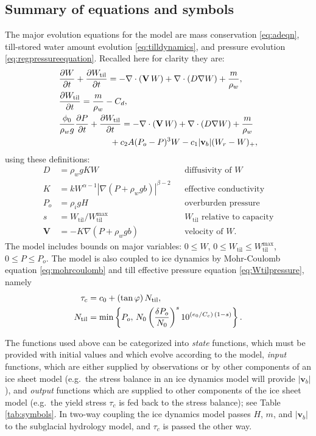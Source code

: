 \documentclass[gmd]{copernicus}   %
\newcommand{\text}{\textrm}
\newcommand\bv{\mathbf{v}}
\newcommand\bV{\mathbf{V}}
\newcommand{\ddt}[1]{\ensuremath{\frac{\partial #1}{\partial t}}}
\newcommand{\Div}{\nabla\cdot}
\newcommand{\grad}{\nabla}
\newcommand{\Ntil}{N_{\text{til}}}
\newcommand{\Wtil}{W_{\text{til}}}
\newcommand{\Wtilmax}{W_{\text{til}}^{\text{max}}}
\begin{document}
\subsection{Summary of equations and symbols}  The major evolution equations for the model are mass conservation \eqref{eq:adeqn}, till-stored water amount evolution \eqref{eq:tilldynamics}, and pressure evolution \eqref{eq:regpressureequation}.  Recalled here for clarity they are:
\begin{align}
&\ddt{W} + \ddt{\Wtil} = - \Div\left(\bV\, W\right) + \Div \left(D \grad W\right) + \frac{m}{\rho_w}, \label{eq:bluebox} \\
&\frac{\partial \Wtil}{\partial t} = \frac{m}{\rho_w} - C_d, \notag \\
&\frac{\phi_0}{\rho_w g} \ddt{P} + \ddt{\Wtil} = - \Div\left(\bV\, W\right) + \Div \left(D \grad W\right) + \frac{m}{\rho_w} \notag \\
& \qquad \qquad \qquad + c_2 A (P_o - P)^3 W - c_1 |\bv_b| (W_r - W)_+, \notag
\end{align}
using these definitions:
\begin{align*}
D    &= \rho_w g K W && \text{diffusivity of $W$} \\
K    &= k W^{\alpha-1} \left|\grad(P+\rho_w g b)\right|^{\beta-2} && \text{effective conductivity} \\
P_o  &= \rho_i g H && \text{overburden pressure} \\
s    &= \Wtil / \Wtilmax && \text{$\Wtil$ relative to capacity} \\
\bV  &= - K \grad\left(P + \rho_w g b\right) && \text{velocity of $W$}.
\end{align*}
The model includes bounds on major variables: $0\le W$, $0\le \Wtil \le \Wtilmax$, $0 \le P \le P_o$.  The model is also coupled to ice dynamics by Mohr-Coulomb equation \eqref{eq:mohrcoulomb} and till effective pressure equation \eqref{eq:Wtilpressure}, namely
\begin{align}
\tau_c &= c_0 + (\tan \varphi)\, \Ntil, \label{eq:taucbox} \\
 \Ntil &= \min\left\{P_o,\, N_0 \left(\frac{\delta P_o}{N_0}\right)^s 10^{(e_0/C_c)\,(1-s)}\right\}. \notag
\end{align}

The functions used above can be categorized into \emph{state} functions, which must be provided with initial values and which evolve according to the model, \emph{input} functions, which are either supplied by observations or by other components of an ice sheet model (e.g.~the stress balance in an ice dynamics model will provide $|\bv_b|$), and \emph{output} functions which are supplied to other components of the ice sheet model (e.g.~the yield stress $\tau_c$ is fed back to the stress balance); see Table \ref{tab:symbols}.  In two-way coupling the ice dynamics model passes $H$, $m$, and $|\bv_b|$ to the subglacial hydrology model, and $\tau_c$ is passed the other way.
\end{document}
